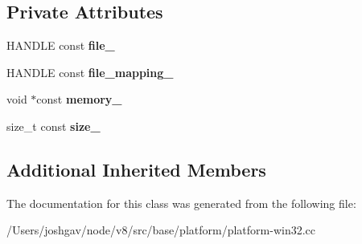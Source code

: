 \subsection*{Private Attributes}
\begin{DoxyCompactItemize}
\item 
H\+A\+N\+D\+LE const {\bfseries file\+\_\+}\hypertarget{classv8_1_1base_1_1_win32_memory_mapped_file_a7b094fea500add8e7ad760bcce2ddd0b}{}\label{classv8_1_1base_1_1_win32_memory_mapped_file_a7b094fea500add8e7ad760bcce2ddd0b}

\item 
H\+A\+N\+D\+LE const {\bfseries file\+\_\+mapping\+\_\+}\hypertarget{classv8_1_1base_1_1_win32_memory_mapped_file_a11fec7c9a5733e81dc115f20092e7a35}{}\label{classv8_1_1base_1_1_win32_memory_mapped_file_a11fec7c9a5733e81dc115f20092e7a35}

\item 
void $\ast$const {\bfseries memory\+\_\+}\hypertarget{classv8_1_1base_1_1_win32_memory_mapped_file_ab68210e4cf1032124aeadae7bd095a4f}{}\label{classv8_1_1base_1_1_win32_memory_mapped_file_ab68210e4cf1032124aeadae7bd095a4f}

\item 
size\+\_\+t const {\bfseries size\+\_\+}\hypertarget{classv8_1_1base_1_1_win32_memory_mapped_file_a0c865611779577193ef2a95c2bc1e6a0}{}\label{classv8_1_1base_1_1_win32_memory_mapped_file_a0c865611779577193ef2a95c2bc1e6a0}

\end{DoxyCompactItemize}
\subsection*{Additional Inherited Members}


The documentation for this class was generated from the following file\+:\begin{DoxyCompactItemize}
\item 
/\+Users/joshgav/node/v8/src/base/platform/platform-\/win32.\+cc\end{DoxyCompactItemize}
